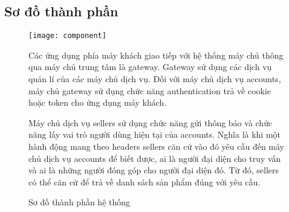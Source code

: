 \fontsize{13px}{13px}\selectfont\justifying

\subsection{Sơ đồ thành phần}

\begin{figure}[h!]\fontsize{13px}{13px}\selectfont
\centering
		\texttt{[image: component]}
		\caption{Sơ đồ thành phần hệ thống}
\justifying
Các ứng dụng phía máy khách giao tiếp với hệ thống máy chủ thông qua máy chủ trung tâm là gateway. Gateway sử dụng các dịch vụ quản lí của các máy chủ dịch vụ. Đối với máy chủ dịch vụ accounts, máy chủ gateway sử dụng chức năng authentication trả về cookie hoặc token cho ứng dụng máy khách.

Máy chủ dịch vụ sellers sử dụng chức năng gửi thông báo và chức năng lấy vai trò người dùng hiện tại của accounts. Nghĩa là khi một hành động mang theo \acrshort{headers} sellers căn cứ vào đó yêu cầu đến máy chủ dịch vụ accounts để biết được, ai là người đại diện cho truy vấn và ai là những người đóng góp cho người đại diện đó. Từ đó, sellers có thể căn cứ để trả về danh sách sản phẩm đúng với yêu cầu.
\end{figure}